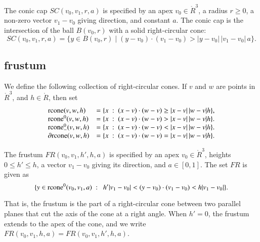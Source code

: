 
\begin{definition}
The conic cap $SC(v_0,v_1,r,a)$ is specified by an apex
$v_0\in\ring{R}^3$, a radius $r\ge0$, a non-zero vector $v_1-v_0$ giving
direction, and constant $a$.  The conic cap is the intersection of
the ball $B(v_0,r)$ with a solid right-circular cone:
    $$
    SC(v_0,v_1,r,a)=\{y \in B(v_0,r) \mid (y-v_0)\cdot (v_1-v_0) > |y-v_0|\, |v_1-v_0|\, a\}.
    $$
\end{definition}

\subsection{frustum}

\begin{definition}[rcone]
We define the following collection of right-circular cones.
If $v$ and $w$ are points in $\ring{R}^3$, and
  $h\in\ring{R}$, then set
  $$\begin{array}{lll}
    {\operatorname{rcone}}(v,w,h) &= \{x\ :\  (x-v)\cdot (w-v) \ge |x-v|\,|w-v| h\},\\
    {\operatorname{rcone}}^0(v,w,h) &= \{x\ :\  (x-v)\cdot (w-v) > |x-v|\,|w-v| h\}.\\
    {\operatorname{rcone}}_-^0(v,w,h) &= \{x\ :\  (x-v)\cdot (w-v) < |x-v|\,|w-v| h\}.\\
    \partial{\operatorname{rcone}}(v,w,h) &= \{x\ :\  (x-v)\cdot (w-v) = |x-v|\,|w-v| h\}.\\
    \end{array}
    $$
\end{definition}



\begin{definition}[frustum, FR] The frustum
$FR(v_0,v_1,h',h,a)$ is specified by an apex $v_0\in\ring{R}^3$, heights
$0\le h'\le h$, a vector $v_1-v_0$ giving its direction, and
$a\in[0,1]$. The set $FR$ is given as
    $$
    \{ y \in\op{rcone}^0(v_0,v_1,a) \mid \ 
       h'|v_1-v_0| < (y-v_0) \cdot (v_1-v_0) < h|v_1-v_0| \}.
    $$
\end{definition}

That is, the frustum is the part of a right-circular cone between two
parallel planes that cut the axis of the cone at a right angle.
When $h'=0$, the frustum extends to the apex of the cone, and
we write $FR(v_0,v_1,h,a)=FR(v_0,v_1,h',h,a)$.

